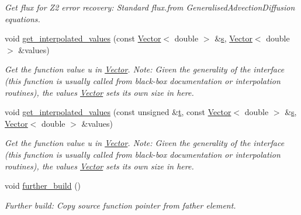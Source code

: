 \begin{DoxyCompactItemize}
\begin{DoxyCompactList}\small\item\em Get \textquotesingle{}flux\textquotesingle{} for Z2 error recovery\+: Standard flux.\+from Generalised\+Advection\+Diffusion equations. \end{DoxyCompactList}\item 
void \hyperlink{classoomph_1_1RefineableGeneralisedAdvectionDiffusionEquations_af995cd64e5a189ebfd0565ac931abe1f}{get\+\_\+interpolated\+\_\+values} (const \hyperlink{classoomph_1_1Vector}{Vector}$<$ double $>$ \&\hyperlink{cfortran_8h_ab7123126e4885ef647dd9c6e3807a21c}{s}, \hyperlink{classoomph_1_1Vector}{Vector}$<$ double $>$ \&values)
\begin{DoxyCompactList}\small\item\em Get the function value u in \hyperlink{classoomph_1_1Vector}{Vector}. Note\+: Given the generality of the interface (this function is usually called from black-\/box documentation or interpolation routines), the values \hyperlink{classoomph_1_1Vector}{Vector} sets its own size in here. \end{DoxyCompactList}\item 
void \hyperlink{classoomph_1_1RefineableGeneralisedAdvectionDiffusionEquations_abee0a8a1988d23678cab1566474c5be2}{get\+\_\+interpolated\+\_\+values} (const unsigned \&\hyperlink{cfortran_8h_af6f0bd3dc13317f895c91323c25c2b8f}{t}, const \hyperlink{classoomph_1_1Vector}{Vector}$<$ double $>$ \&\hyperlink{cfortran_8h_ab7123126e4885ef647dd9c6e3807a21c}{s}, \hyperlink{classoomph_1_1Vector}{Vector}$<$ double $>$ \&values)
\begin{DoxyCompactList}\small\item\em Get the function value u in \hyperlink{classoomph_1_1Vector}{Vector}. Note\+: Given the generality of the interface (this function is usually called from black-\/box documentation or interpolation routines), the values \hyperlink{classoomph_1_1Vector}{Vector} sets its own size in here. \end{DoxyCompactList}\item 
void \hyperlink{classoomph_1_1RefineableGeneralisedAdvectionDiffusionEquations_a03a7314c44b1f5a8f89bc16f8b62b5dc}{further\+\_\+build} ()
\begin{DoxyCompactList}\small\item\em Further build\+: Copy source function pointer from father element. \end{DoxyCompactList}\end{DoxyCompactItemize}
